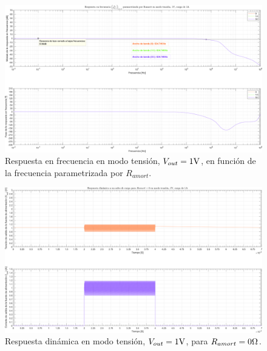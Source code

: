 \clearpage

\begin{figure}[H] %
\begin{center}
\includegraphics[width=1.1 \textwidth, angle=90]{./img/plots/rf/power_supply_RAMORT_RF_Modo2.png}
\caption{\label{fig:fig_power_supply_RAMORT_RF_Modo2}\footnotesize{Respuesta en frecuencia en modo tensión, $V_{out} = 1 \si[per-mode=symbol]{\volt}$, en función de la frecuencia parametrizada por $R_{amort}$.}}
\end{center}
\end{figure}

\clearpage

\begin{figure}[H] %
\begin{center}
\includegraphics[width=1.1 \textwidth, angle=90]{./img/plots/dynamic/power_supply_RAMORT_0_STEP_Modo2.png}
\caption{\label{fig:fig_power_supply_RAMORT_STEP_0_Modo2}\footnotesize{Respuesta dinámica en modo tensión, $V_{out} = 1 \si[per-mode=symbol]{\volt}$, para $R_{amort} = 0 \si[per-mode=symbol]{\ohm} $.}}
\end{center}
\end{figure}

